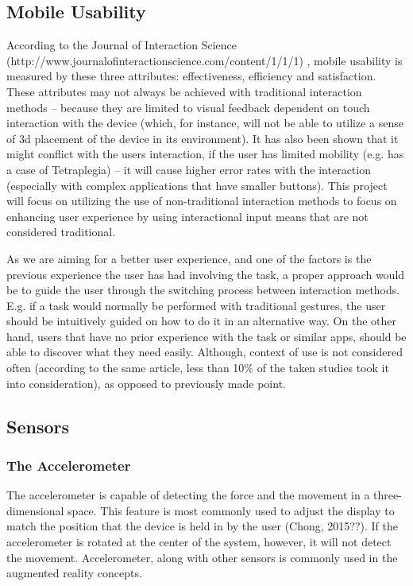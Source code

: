 \subsection{Mobile Usability}
According to the Journal of Interaction Science (http://www.journalofinteractionscience.com/content/1/1/1) , mobile usability is measured by these three attributes: effectiveness, efficiency and satisfaction. These attributes may not always be achieved with traditional interaction methods – because they are limited to visual feedback dependent on touch interaction with the device (which, for instance, will not be able to utilize a sense of 3d placement of the device in its environment). It has also been shown that it might conflict with the users interaction, if the user has limited mobility (e.g. has a case of Tetraplegia) – it will cause higher error rates with the interaction (especially with complex applications that have smaller buttons). This project will focus on utilizing the use of non-traditional interaction methods to focus on enhancing user experience by using interactional input means that are not considered traditional.

As we are aiming for a better user experience, and one of the factors is the previous experience the user has had involving the task, a proper approach would be to guide the user through the switching process between interaction methods. E.g. if a task would normally be performed with traditional gestures, the user should be intuitively guided on how to do it in an alternative way. On the other hand, users that have no prior experience with the task or similar apps, should be able to discover what they need easily. Although, context of use is not considered often (according to the same article, less than 10\% of the taken studies took it into consideration), as opposed to previously made point.

\subsection{Sensors} \label{sensors}
\subsubsection*{The Accelerometer}
The accelerometer is capable of detecting the force and the movement in a three-dimensional space. This feature is most commonly used to adjust the display to match the position that the device is held in by the user (Chong, 2015??). If the accelerometer is rotated at the center of the system, however, it will not detect the movement. Accelerometer, along with other sensors is commonly used in the augmented reality concepts.
